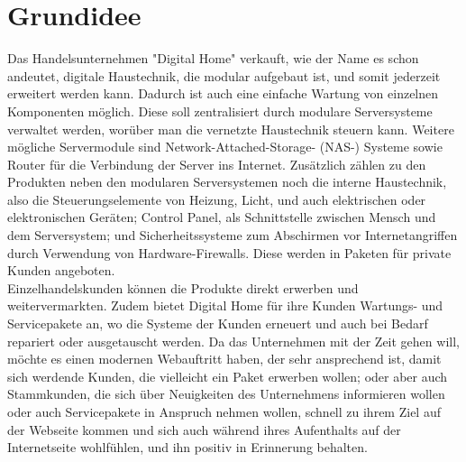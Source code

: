 \section{Grundidee}

Das Handelsunternehmen "Digital Home" verkauft, wie der Name es schon andeutet, digitale Haustechnik, die modular aufgebaut ist, und somit jederzeit erweitert werden kann. Dadurch ist auch eine einfache Wartung von einzelnen Komponenten möglich. Diese soll zentralisiert durch modulare Serversysteme verwaltet werden, worüber man die vernetzte Haustechnik steuern kann. Weitere mögliche Servermodule sind Network-Attached-Storage- (NAS-) Systeme sowie Router für die Verbindung der Server ins Internet. Zusätzlich zählen zu den Produkten neben den modularen Serversystemen noch die interne Haustechnik, also die Steuerungselemente von Heizung, Licht, und auch elektrischen oder elektronischen Geräten; Control Panel, als Schnittstelle zwischen Mensch und dem Serversystem; und Sicherheitssysteme zum Abschirmen vor Internetangriffen durch Verwendung von Hardware-Firewalls. Diese werden in Paketen für private Kunden angeboten.  
\\
Einzelhandelskunden können die Produkte direkt erwerben und weitervermarkten. Zudem bietet Digital Home für ihre Kunden Wartungs- und Servicepakete an, wo die Systeme der Kunden erneuert und auch bei Bedarf repariert oder ausgetauscht werden.
\newline
\newline
Da das Unternehmen mit der Zeit gehen will, möchte es einen modernen Webauftritt haben, der sehr ansprechend ist, damit sich werdende Kunden, die vielleicht ein Paket erwerben wollen; oder aber auch Stammkunden, die sich über Neuigkeiten des Unternehmens informieren wollen oder auch Servicepakete in Anspruch nehmen wollen, schnell zu ihrem Ziel auf der Webseite kommen und sich auch während ihres Aufenthalts auf der Internetseite wohlfühlen, und ihn positiv in Erinnerung behalten.
